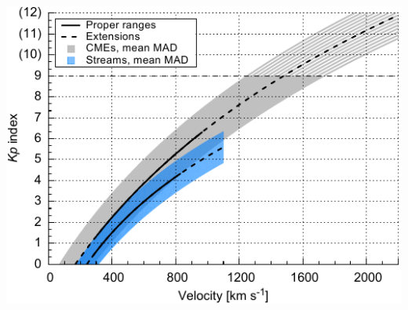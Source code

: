 \begin{frame}[c]{}{}
	\begin{columns}[c]
		
		\includegraphics[width=\textwidth]{../figures_of_mine/chapter2/Kp_2dhistogram_V_sws123_fit_f3.pdf}


	\end{columns}
\end{frame}

